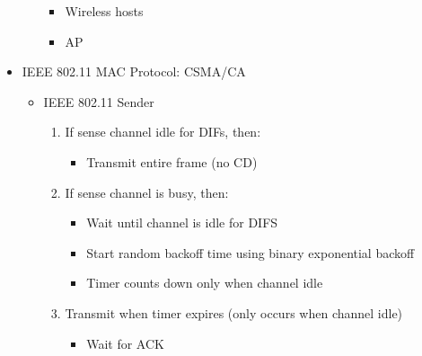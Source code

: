 \begin{itemize}
\begin{itemize}
        \begin{itemize}

          \item Wireless hosts

          \item AP

        \end{itemize}

    \end{itemize}

  \item IEEE 802.11 MAC Protocol: CSMA/CA

    \begin{itemize}

      \item IEEE 802.11 Sender

        \begin{enumerate}

          \item If sense channel idle for DIFs, then:

            \begin{itemize}

              \item Transmit entire frame (no CD)

            \end{itemize}

          \item If sense channel is busy, then:

            \begin{itemize}

              \item Wait until channel is idle for DIFS

              \item Start random backoff time using binary exponential backoff

              \item Timer counts down only when channel idle

            \end{itemize}

          \item Transmit when timer expires (only occurs when channel idle)

            \begin{itemize}

              \item Wait for ACK


\end{itemize}
\end{enumerate}
\end{itemize}
\end{itemize}
